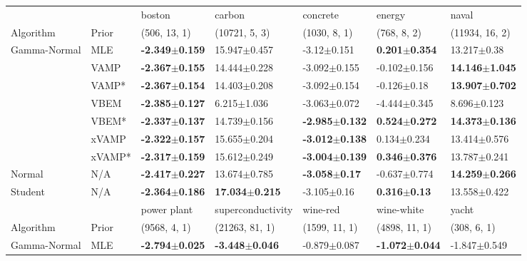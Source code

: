 \begin{tabular}{lllllll}
\toprule
        &     &                     boston &                     carbon &                   concrete &                    energy &                      naval \\
Algorithm & Prior& (506, 13, 1)& (10721, 5, 3)& (1030, 8, 1)& (768, 8, 2)& (11934, 16, 2)\\
\midrule
Gamma-Normal & MLE &  \textbf{-2.349$\pm$0.159} &           15.947$\pm$0.457 &            -3.12$\pm$0.151 &  \textbf{0.201$\pm$0.354} &            13.217$\pm$0.38 \\
        & VAMP &  \textbf{-2.367$\pm$0.155} &           14.444$\pm$0.228 &           -3.092$\pm$0.155 &          -0.102$\pm$0.156 &  \textbf{14.146$\pm$1.045} \\
        & VAMP* &  \textbf{-2.367$\pm$0.154} &           14.403$\pm$0.208 &           -3.092$\pm$0.154 &           -0.126$\pm$0.18 &  \textbf{13.907$\pm$0.702} \\
        & VBEM &  \textbf{-2.385$\pm$0.127} &            6.215$\pm$1.036 &           -3.063$\pm$0.072 &          -4.444$\pm$0.345 &            8.696$\pm$0.123 \\
        & VBEM* &  \textbf{-2.337$\pm$0.137} &           14.739$\pm$0.156 &  \textbf{-2.985$\pm$0.132} &  \textbf{0.524$\pm$0.272} &  \textbf{14.373$\pm$0.136} \\
        & xVAMP &  \textbf{-2.322$\pm$0.157} &           15.655$\pm$0.204 &  \textbf{-3.012$\pm$0.138} &           0.134$\pm$0.234 &           13.414$\pm$0.576 \\
        & xVAMP* &  \textbf{-2.317$\pm$0.159} &           15.612$\pm$0.249 &  \textbf{-3.004$\pm$0.139} &  \textbf{0.346$\pm$0.376} &           13.787$\pm$0.241 \\
Normal & N/A &  \textbf{-2.417$\pm$0.227} &           13.674$\pm$0.785 &   \textbf{-3.058$\pm$0.17} &          -0.637$\pm$0.774 &  \textbf{14.259$\pm$0.266} \\
Student & N/A &  \textbf{-2.364$\pm$0.186} &  \textbf{17.034$\pm$0.215} &            -3.105$\pm$0.16 &   \textbf{0.316$\pm$0.13} &           13.558$\pm$0.422 \\
\midrule
        &     &                power plant &          superconductivity &                   wine-red &                 wine-white &                      yacht \\
Algorithm & Prior& (9568, 4, 1)& (21263, 81, 1)& (1599, 11, 1)& (4898, 11, 1)& (308, 6, 1)\\
\midrule
Gamma-Normal & MLE &  \textbf{-2.794$\pm$0.025} &  \textbf{-3.448$\pm$0.046} &           -0.879$\pm$0.087 &  \textbf{-1.072$\pm$0.044} &           -1.847$\pm$0.549 \\

\end{tabular}
